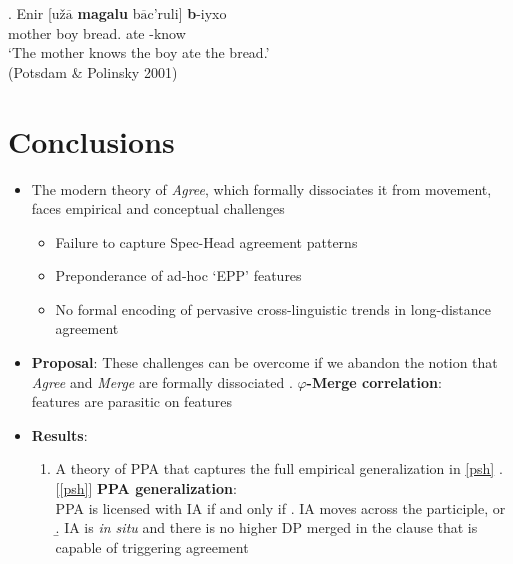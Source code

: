 \documentclass[letterpaper,10pt]{handout_nick}
\begin{document}
\begin{itemize}
\begin{itemize}
\exg. Enir [{u\v{z}$\overline{\text{a}}$} \textbf{magalu} b$\overline{\text{a}}$c'ruli] \textbf{b}-iyxo\\
mother boy bread. ate -know\\
`The mother knows the boy ate the bread.'\\
(Potsdam \& Polinsky 2001)
 
\end{itemize}
\end{itemize}

\section{Conclusions}
\begin{itemize}
\item The modern theory of \emph{Agree}, which formally dissociates it from movement, faces empirical and conceptual challenges
\begin{itemize}
\item Failure to capture Spec-Head agreement patterns
\item Preponderance of ad-hoc `EPP' features
\item No formal encoding of pervasive cross-linguistic trends in long-distance agreement 
\end{itemize}
\item \textbf{Proposal}: These challenges can be overcome if we abandon the notion that \emph{Agree} and \emph{Merge} are formally dissociated
\ex. {\bf $\varphi$-Merge correlation}:\\
\fa{$\varphi$} features are parasitic on \fm{$\varphi$} features

\newpage
\item \textbf{Results}:
\begin{enumerate}
\item A theory of PPA that captures the full empirical generalization in \ref{psh} 
\ex.[\ref{psh}] {\bf PPA generalization}:\\
PPA is licensed with IA if and only if
\a. IA moves across the participle, or
\b. IA is \emph{in situ} and there is no higher DP merged in the clause that is capable of triggering agreement 


\end{enumerate}
\end{itemize}
\end{document}
